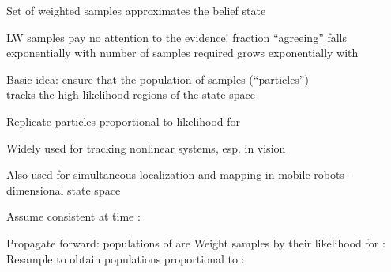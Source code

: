 \documentclass{article}
\begin{document}
\begin{huge}
Set of weighted samples approximates the belief state

\vspace*{0.2in}

\textwidth
{}

LW samples pay no attention to the evidence!\nl
   \mat{$\Rightarrow$} fraction ``agreeing'' falls exponentially with \nl
   \mat{$\Rightarrow$} number of samples required grows exponentially with 

\vspace*{0.0in}

\textwidth
{}




Basic idea: ensure that the population of samples (``particles'')\\
tracks the high-likelihood regions of the state-space

Replicate particles proportional to likelihood for 

\vspace*{0.2in}

\textwidth
{}

Widely used for tracking nonlinear systems, esp. in vision

Also used for simultaneous localization and mapping in mobile robots\al
 -dimensional state space



Assume consistent at time : 

Propagate forward: populations of  are
\mat{\[
  N(\x_{t+1}|\e_{1:t}) = \mysum_{\sx_t} P(\x_{t+1}|\x_t) N(\x_t|\e_{1:t})   
\]}
Weight samples by their likelihood for :
\mat{\[
  W(\x_{t+1}|\e_{1:t+1}) = P(\e_{t+1}|\x_{t+1}) N(\x_{t+1}|\e_{1:t}) 
\]}
Resample to obtain populations proportional to :



\end{huge}
\end{document}
